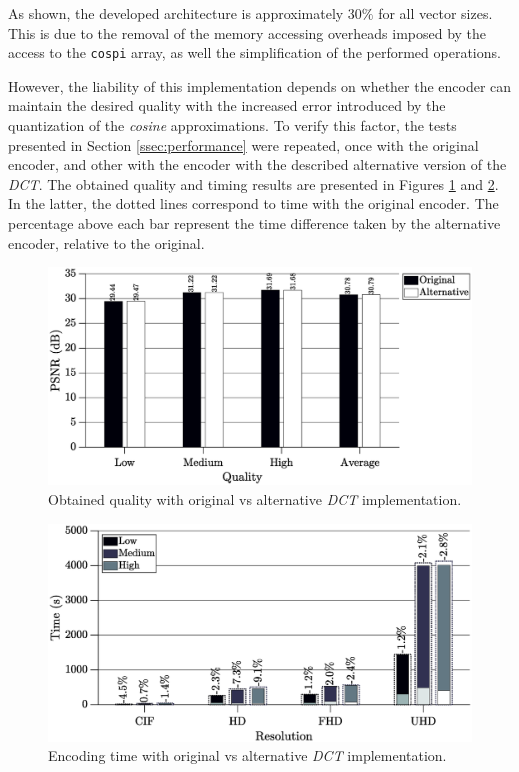 As shown, the developed architecture is approximately $30\%$ for all vector sizes. This is due to the removal of the memory accessing overheads imposed by the access to the \texttt{cospi} array, as well the simplification of the performed operations. 

However, the liability of this implementation depends on whether the encoder can maintain the desired quality with the increased error introduced by the quantization of the \emph{cosine} approximations. To verify this factor, the tests presented in Section \ref{ssec:performance} were repeated, once with the original encoder, and other with the encoder with the described alternative version of the \emph{DCT}. The obtained quality and timing results are presented in Figures \ref{fig:buttqual} and \ref{fig:butttime}. In the latter, the dotted lines correspond to time with the original encoder. The percentage above each bar represent the time difference taken by the alternative encoder, relative to the original.

\begin{figure}[!htpb]
    \centering
    \includegraphics[width=\textwidth]{Sections/4DevelopedArchitecture/Figures/buttmultqual.eps}
    \caption{Obtained quality with original vs alternative \emph{DCT} implementation.}
    \label{fig:buttqual}
\end{figure}

\begin{figure}[!htpb]
    \centering
    \includegraphics[width=\textwidth]{Sections/4DevelopedArchitecture/Figures/buttmulttime.eps}
    \caption{Encoding time with original vs alternative \emph{DCT} implementation.}
    \label{fig:butttime}
\end{figure}

